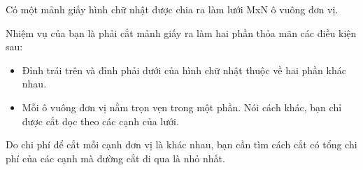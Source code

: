 Có một mảnh giấy hình chữ nhật được chia ra làm lưới MxN ô vuông đơn vị.

Nhiệm vụ của bạn là phải cắt mảnh giấy ra làm hai phần thỏa mãn các điều kiện sau:
\begin{itemize}
	\item Đỉnh trái trên và đỉnh phải dưới của hình chữ nhật thuộc về hai phần khác nhau.
	\item Mỗi ô vuông đơn vị nằm trọn vẹn trong một phần. Nói cách khác, bạn chỉ được cắt dọc theo các cạnh của lưới.
\end{itemize}

Do chi phí để cắt mỗi cạnh đơn vị là khác nhau, bạn cần tìm cách cắt có tổng chi phí của các cạnh mà đường cắt đi qua là nhỏ nhất.